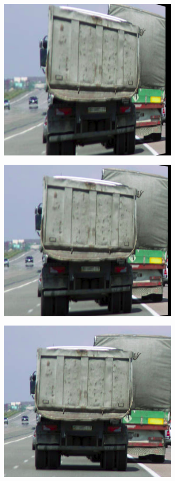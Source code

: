 \begin{figure}
\centering
\begin{subfigure}{.19\linewidth}
  \centering
  \includegraphics[width=0.7\linewidth]{imgs/truck_example/truck_rr}
\end{subfigure}
\begin{subfigure}{.19\linewidth}
  \centering
  \includegraphics[width=0.7\linewidth]{imgs/truck_example/truck_r}
\end{subfigure}
\begin{subfigure}{.19\linewidth}
  \centering
  \includegraphics[width=0.7\linewidth]{imgs/truck_example/truck_c}

\end{subfigure}
\end{figure}
